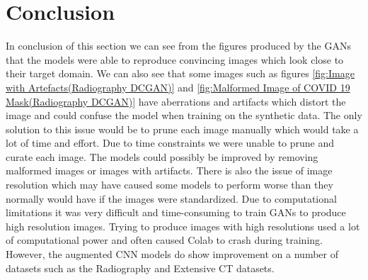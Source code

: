 \section{Conclusion}
In conclusion of this section we can see from the figures produced by the GANs that the models were able to reproduce convincing images which look close to their target domain.  We can also see that some images such as figures \ref{fig:Image with Artefacts(Radiography DCGAN)} and \ref{fig:Malformed Image of COVID 19 Mask(Radiography DCGAN)} have aberrations and artifacts which distort the image and could confuse the model when training on the synthetic data.  The only solution to this issue would be to prune each image manually which would take a lot of time and effort.  Due to time constraints we were unable to prune and curate each image.  The models could possibly be improved by removing malformed images or images with artifacts.  There is also the issue of image resolution which may have caused some models to perform worse than they normally would have if the images were standardized.  Due to computational limitations it was very difficult and time-consuming to train GANs to produce high resolution images.  Trying to produce images with high resolutions used a lot of computational power and often caused Colab to crash during training.  However, the augmented CNN models do show improvement on a number of datasets such as the Radiography and Extensive CT datasets. 
